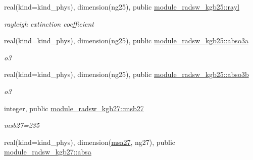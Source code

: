 \begin{DoxyCompactItemize}
\mbox{\label{group__module__radsw__kgbnn_ga3d32a0d74d03129cacd9c4bb2e58683a}} 
real(kind=kind\+\_\+phys), dimension(ng25), public \hyperlink{group__module__radsw__kgbnn_ga3d32a0d74d03129cacd9c4bb2e58683a}{module\+\_\+radsw\+\_\+kgb25\+::rayl}
\begin{DoxyCompactList}\small\item\em rayleigh extinction coefficient \end{DoxyCompactList}\item 
\mbox{\label{group__module__radsw__kgbnn_gab02765dac8ca71a439cdaf1ed2691851}} 
real(kind=kind\+\_\+phys), dimension(ng25), public \hyperlink{group__module__radsw__kgbnn_gab02765dac8ca71a439cdaf1ed2691851}{module\+\_\+radsw\+\_\+kgb25\+::abso3a}
\begin{DoxyCompactList}\small\item\em o3 \end{DoxyCompactList}\item 
\mbox{\label{group__module__radsw__kgbnn_ga2844cade392c8805b1d418bc1260b3a5}} 
real(kind=kind\+\_\+phys), dimension(ng25), public \hyperlink{group__module__radsw__kgbnn_ga2844cade392c8805b1d418bc1260b3a5}{module\+\_\+radsw\+\_\+kgb25\+::abso3b}
\begin{DoxyCompactList}\small\item\em o3 \end{DoxyCompactList}\item 
\mbox{\label{group__module__radsw__kgbnn_ga3b2e57a0d4596aead5cad5aaca74850d}} 
integer, public \hyperlink{group__module__radsw__kgbnn_ga3b2e57a0d4596aead5cad5aaca74850d}{module\+\_\+radsw\+\_\+kgb27\+::msb27}
\begin{DoxyCompactList}\small\item\em msb27=235 \end{DoxyCompactList}\item 
\mbox{\label{group__module__radsw__kgbnn_gaaf6ba2ea0beacba67c045a10d7a6a782}} 
real(kind=kind\+\_\+phys), dimension(\hyperlink{namespacemodule__radsw__kgb27_abdab838f66aba14b64bce733f797cf26}{msa27}, ng27), public \hyperlink{group__module__radsw__kgbnn_gaaf6ba2ea0beacba67c045a10d7a6a782}{module\+\_\+radsw\+\_\+kgb27\+::absa}

\end{DoxyCompactItemize}
